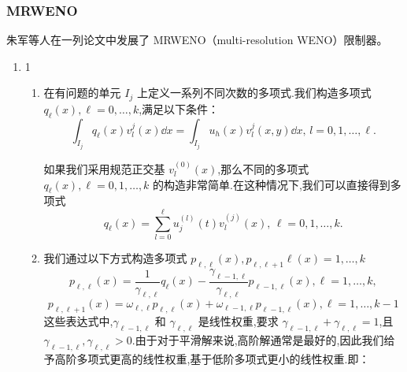 \documentclass{book}
\begin{document}
\begin{example}
\begin{example}{}{}
\begin{example}
\begin{example}
\begin{example}
\subsubsection{MRWENO}
朱军等人在一列论文\cite{MRWENO-1,MRWENO-2,MRWENO-3}中发展了 MRWENO（multi-resolution WENO）限制器。
\begin{enumerate}[label={{\bf Step \arabic*}:}]
    \item 1
          \begin{enumerate}[label={\bf Step 1.\arabic*.}]
              \item 在有问题的单元 $I_j$ 上定义一系列不同次数的多项式.我们构造多项式 $q_{\ell}(x), \ell=0, \ldots, k$,满足以下条件：
                    \begin{equation}
                        \int_{I_j} q_{\ell}(x) v_{l}^{j}(x) \dd x=\int_{I_j} u_{h}(x) v_{l}^{j}(x, y) \dd x,\, l=0,1, \ldots, \ell.
                    \end{equation}
                    \begin{remark}
                        如果我们采用规范正交基 $v_{l}^{(0)}(x)$,那么不同的多项式 $q_{\ell}(x), \ell=0,1, \ldots, k$ 的构造非常简单.在这种情况下,我们可以直接得到多项式
                        \begin{equation}
                            q_{\ell}(x)=\sum_{l=0}^{\ell} u_{j}^{(l)}(t) v_{l}^{(j)}(x),\,\ell=0,1,\ldots, k.
                        \end{equation}
                    \end{remark}
              \item 我们通过以下方式构造多项式 $p_{\ell, \ell}(x),p_{\ell,\ell+1} \ell(x)=1, \ldots, k$
                    \begin{equation}
                        p_{\ell, \ell}(x)=\frac{1}{\gamma_{\ell, \ell}} q_{\ell}(x)-\frac{\gamma_{\ell-1, \ell}}{\gamma_{\ell, \ell}} p_{\ell-1, \ell}(x), \ell=1, \ldots, k,
                    \end{equation}
                    \begin{equation}
                        p_{\ell, \ell+1}(x)=\omega_{\ell, \ell} p_{\ell, \ell}(x)+\omega_{\ell-1, \ell} p_{\ell-1, \ell}(x), \ell=1, \ldots, k-1
                    \end{equation}
                    这些表达式中,$\gamma_{\ell-1, \ell}$ 和 $\gamma_{\ell, \ell}$ 是线性权重,要求 $\gamma_{\ell-1, \ell}+\gamma_{\ell, \ell}=1$,且 $\gamma_{\ell-1, \ell},\gamma_{\ell, \ell}>0$.由于对于平滑解来说,高阶解通常是最好的,因此我们给予高阶多项式更高的线性权重,基于低阶多项式更小的线性权重.即：

\end{enumerate}
\end{enumerate}
\end{example}
\end{example}
\end{example}
\end{example}
\end{example}
\end{document}
